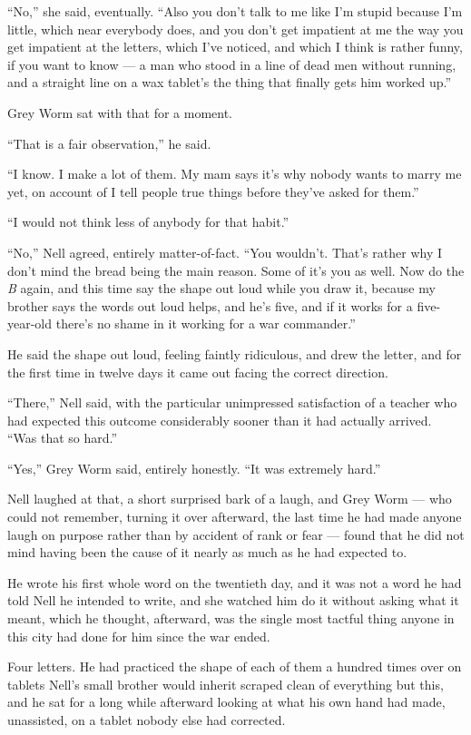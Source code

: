 “No,” she said, eventually. “Also you don’t talk to me like I’m stupid because I’m little, which near everybody does, and you don’t get impatient at me the way you get impatient at the letters, which I’ve noticed, and which I think is rather funny, if you want to know — a man who stood in a line of dead men without running, and a straight line on a wax tablet’s the thing that finally gets him worked up.”

Grey Worm sat with that for a moment.

“That is a fair observation,” he said.

“I know. I make a lot of them. My mam says it’s why nobody wants to marry me yet, on account of I tell people true things before they’ve asked for them.”

“I would not think less of anybody for that habit.”

“No,” Nell agreed, entirely matter-of-fact. “You wouldn’t. That’s rather why I don’t mind the bread being the main reason. Some of it’s you as well. Now do the \textit{B} again, and this time say the shape out loud while you draw it, because my brother says the words out loud helps, and he’s five, and if it works for a five-year-old there’s no shame in it working for a war commander.”

He said the shape out loud, feeling faintly ridiculous, and drew the letter, and for the first time in twelve days it came out facing the correct direction.

“There,” Nell said, with the particular unimpressed satisfaction of a teacher who had expected this outcome considerably sooner than it had actually arrived. “Was that so hard.”

“Yes,” Grey Worm said, entirely honestly. “It was extremely hard.”

Nell laughed at that, a short surprised bark of a laugh, and Grey Worm — who could not remember, turning it over afterward, the last time he had made anyone laugh on purpose rather than by accident of rank or fear — found that he did not mind having been the cause of it nearly as much as he had expected to.

\sceneBreak

He wrote his first whole word on the twentieth day, and it was not a word he had told Nell he intended to write, and she watched him do it without asking what it meant, which he thought, afterward, was the single most tactful thing anyone in this city had done for him since the war ended.

Four letters. He had practiced the shape of each of them a hundred times over on tablets Nell’s small brother would inherit scraped clean of everything but this, and he sat for a long while afterward looking at what his own hand had made, unassisted, on a tablet nobody else had corrected.

